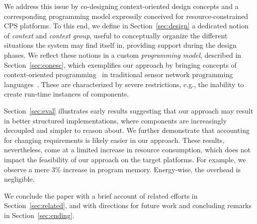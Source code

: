 We address this issue by co-designing context-oriented design concepts
and a corresponding programming model expressily conceived for
resource-constrained CPS platforms. To this end, we define in
Section~\ref{sec:design} a dedicated notion of \emph{context} and
\emph{context group}, useful to conceptually organize the different
situations the system may find itself in, providing support during the
design phases. We reflect these notions in a custom \emph{programming
  model}, described in Section~\ref{sec:conesc}, which exemplifies our
approach by bringing concepts of context-oriented
programming~\cite{cop} in traditional sensor network programming
languages~\cite{nesc}. These are characterized by severe restrictions,
e.g., the inability to create run-time instances of components.

Section~\ref{sec:eval} illustrates early results suggesting that our
approach may result in better structured implementations, where
components are increasingly decoupled and simpler to reason about. We
further demonstrate that accounting for changing requirements is
likely easier in our approach. These results, nevertheless, come at a
limited increase in resource consumption, which does not impact the
feasibility of our approach on the target platforms. For example, we
observe a mere 3\% increase in program memory. Energy-wise, the
overhead is negligible.

We conclude the paper with a brief account of related efforts in
Section~\ref{sec:related}, and with directions for future work and
concluding remarks in Section~\ref{sec:ending}.







